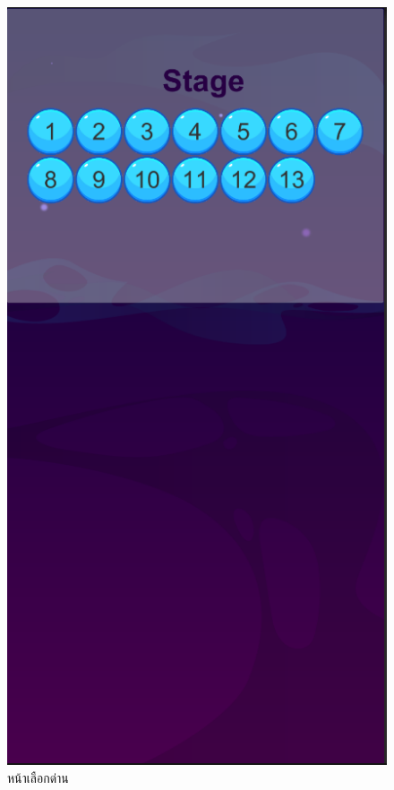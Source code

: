 \begin{figure}
\begin{center}
\includegraphics[scale = 0.4]{pic/stage.PNG}
\end{center}
\caption[Poem]{หน้าเลือกด่าน}
\label{stage}
\end{figure}

